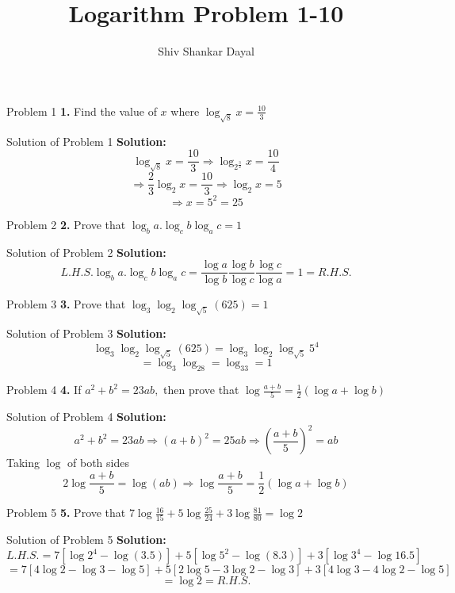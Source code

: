 \documentclass[aspectratio=1610,8pt]{beamer}
\title{Logarithm Problem 1-10}
\author[Shiv Shankar Dayal]{Shiv Shankar Dayal}
\begin{document}
\begin{frame}
  \titlepage
\end{frame}
\begin{frame}{Problem 1}
  \textbf{1.} Find the value of $x$ where $\log_{\sqrt{8}}x = \frac{10}{3}$
\end{frame}
\begin{frame}{Solution of Problem 1}
  \textbf{Solution:} $$\log_{\sqrt{8}}x = \frac{10}{3}\Rightarrow \log_{2^{\frac{3}{2}}}x = \frac{10}{4}$$
  $$\Rightarrow \frac{2}{3}\log_2 x = \frac{10}{3}\Rightarrow \log_2x = 5$$
  $$\Rightarrow x = 5^2 = 25$$
\end{frame}
\begin{frame}{Problem 2}
  \textbf{2.} Prove that $\log_ba.\log_cb\log_ac = 1$
\end{frame}
\begin{frame}{Solution of Problem 2}
  \textbf{Solution:} $$L.H.S. \log_ba.\log_cb\log_ac = \frac{\log a}{\log b}\frac{\log b}{\log c}\frac{\log c}{\log a} = 1 = R.H.S.$$
\end{frame}
\begin{frame}{Problem 3}
  \textbf{3.} Prove that $\log_3\log_2\log_{\sqrt{5}}(625) = 1$
\end{frame}
\begin{frame}{Solution of Problem 3}
  \textbf{Solution:} $$\log_3\log_2\log_{\sqrt{5}}(625) = \log_3\log_2\log_{\sqrt{5}}5^4$$
  $$= \log_3\log_28 = \log_33 = 1$$
\end{frame}
\begin{frame}{Problem 4}
  \textbf{4.} If $a^2 + b^2 = 23ab,$ then prove that $\log \frac{a + b}{5} = \frac{1}{2}(\log a + \log b)$
\end{frame}
\begin{frame}{Solution of Problem 4}
  \textbf{Solution:} $$a^2 + b^2 = 23ab \Rightarrow (a + b)^2 = 25ab \Rightarrow \left(\frac{a + b}{5}\right)^2 = ab$$
  Taking $\log$ of both sides
  $$2\log\frac{a + b}{5} = \log(ab) \Rightarrow \log \frac{a + b}{5} = \frac{1}{2}(\log a + \log b)$$
\end{frame}
\begin{frame}{Problem 5}
  \textbf{5.} Prove that $7\log\frac{16}{15}+ 5\log\frac{25}{24} + 3\log\frac{81}{80} = \log 2$
\end{frame}
\begin{frame}{Solution of Problem 5}
  \textbf{Solution:} $$L.H.S. = 7[\log 2^4 - \log(3.5)] + 5[\log 5^2 - \log(8.3)] + 3[\log 3^4 - \log 16.5]$$
  $$= 7[4\log 2 - \log 3 - \log 5] + 5[2\log 5 - 3\log 2 - \log 3] + 3[4\log 3 - 4\log 2 - \log 5]$$
  $$= \log 2 = R.H.S.$$
\end{frame}
\end{document}
